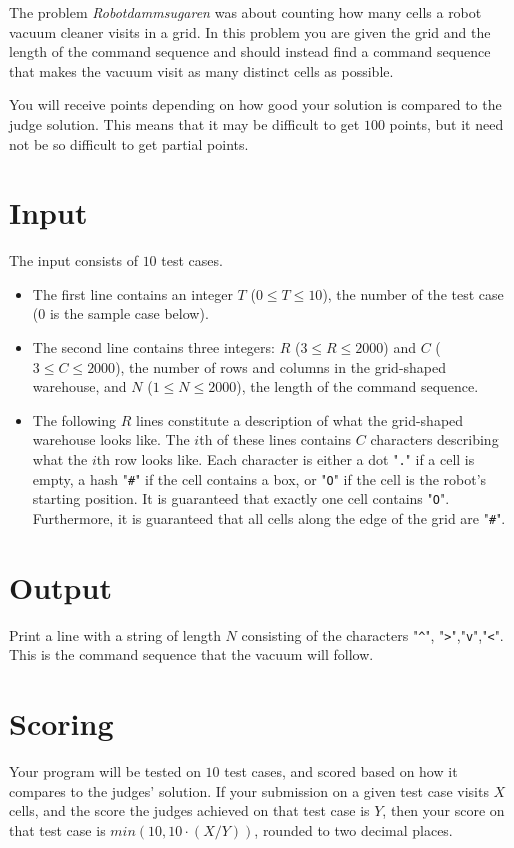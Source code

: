 
The problem \textit{Robotdammsugaren} was about counting how many cells a robot vacuum cleaner
visits in a grid. In this problem you are given the grid and the length of the command sequence
and should instead find a command sequence that makes the vacuum visit as many distinct cells as possible.

You will receive points depending on how good your solution is compared to the judge solution. This means that it may
be difficult to get $100$ points, but it need not be so difficult to get partial points.

\section*{Input}
The input consists of $10$ test cases.

\begin{itemize}
  \item
    The first line contains an integer $T$ ($0 \leq T \leq 10$), the number of the test case ($0$ is the sample case below).
  \item
    The second line contains three integers: $R$ ($3 \le R \le 2000$) and $C$ ($3 \le C \le 2000$),
    the number of rows and columns in the grid-shaped warehouse, and $N$ ($1 \le N \le 2000$), the length of the command sequence.
  \item
    The following $R$ lines constitute a description of what the grid-shaped warehouse looks like.
    The $i$th of these lines contains $C$ characters describing what the $i$th row looks like.
    Each character is either a dot "\verb|.|" if a cell is empty, a hash "\verb|#|" if the cell contains a box, or "\verb|O|" if the cell is the robot's starting position. It is guaranteed that exactly one cell contains "\verb|O|". Furthermore, it is guaranteed that all cells along the edge of the grid are "\verb|#|".
\end{itemize}

\section*{Output}
Print a line with a string of length $N$ consisting of the characters "\verb|^|", "\verb|>|","\verb|v|","\verb|<|".
This is the command sequence that the vacuum will follow.


\section*{Scoring}
Your program will be tested on $10$ test cases, and scored based on how it compares to the judges' solution.
If your submission on a given test case visits $X$ cells, and the score the judges achieved on that test case is $Y$,
then your score on that test case is $min(10, 10 \cdot (X / Y))$, rounded to two decimal places.

